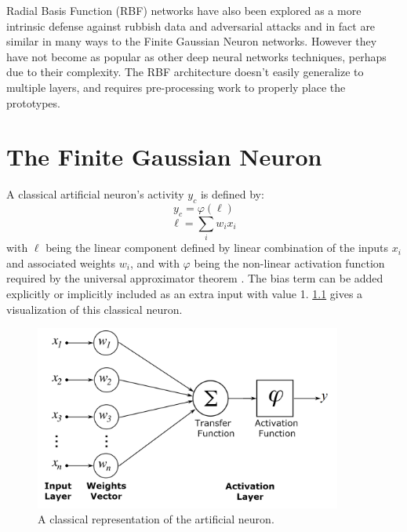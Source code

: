 \documentclass[12pt,oneside]{CUNY_PhD}
\begin{document}
Radial Basis Function (RBF) networks have also been explored as a more intrinsic defense against rubbish data and adversarial attacks\cite{chenou2019radial,zadeh2018deeprbf} and in fact are similar in many ways to the Finite Gaussian Neuron networks. However they have not become as popular as other deep neural networks techniques, perhaps due to their complexity. The RBF architecture doesn't easily generalize to multiple layers, and requires pre-processing work to properly place the prototypes.


\chapter{The Finite Gaussian Neuron}
A classical artificial neuron's activity $y_c$ is defined by: 
\[ y_{c} = \varphi(\ell) \]
\[ \ell = \sum_{i}w_i x_i\]
with $\ell$ being the linear component defined by linear combination of the inputs $x_i$ and associated weights $w_i$, and with $\varphi$ being the non-linear activation function required by the universal approximator theorem \cite{cybenko1989approximation, hornik1989multilayer}. The bias term can be added explicitly or implicitly included as an extra input with value 1. \ref{fig:classic-neuron} gives a visualization of this classical neuron. 
\begin{figure}[!htbp]
    \centering
    \includegraphics[width=0.9\textwidth]{images/artificial_neuron_model.png}
    \caption{A classical representation of the artificial neuron.}
    \label{fig:classic-neuron}
\end{figure}\\
\end{document}
